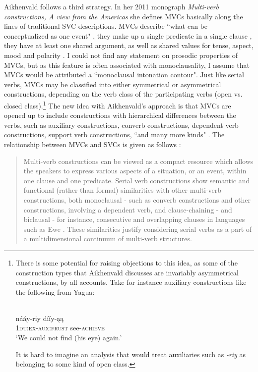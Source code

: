 Aikhenvald follows a third strategy. In her 2011 monograph \textit{Multi-verb constructions, A view from the Americas} she defines MVCs basically along the lines of traditional SVC descriptions. MVCs describe ``what can be conceptualized as one event" \citep[vii]{Aikhenvald2011}, they make up a single predicate in a single clause \citep[1]{Aikhenvald2011}, they have at least one shared argument, as well as shared values for tense, aspect, mood and polarity \citep[19]{Aikhenvald2011}. I could not find any statement on prosodic properties of MVCs, but as this feature is often associated with monoclausality, I assume that MVCs would be attributed a ``monoclausal intonation contour". Just like serial verbs, MVCs may be classified into either symmetrical or asymmetrical constructions, depending on the verb class of the participating verbs (open vs. closed class).\footnote{There is some potential for raising objections to this idea, as some of the construction types that Aikhenvald discusses are invariably asymmetrical constructions, by all accounts. Take for instance auxiliary constructions like the following from Yagua:

\ea 
{}\\
\gll nááy-riy dííy-ąą \\
\textsc{1}\textsc{du}:\textsc{ex}-\textsc{aux}:\textsc{frust} see-\textsc{achieve} \\
\glft `We could not find (his eye) again.'\\ 
\z

It is hard to imagine an analysis that would treat auxiliaries such as \textit{-riy} as belonging to some kind of open class.} The new idea with Aikhenvald's approach is that MVCs are opened up to include constructions with hierarchical differences between the verbs, such as auxiliary constructions, converb constructions, dependent verb constructions, support verb constructions, ``and many more kinds" \citep[vii]{Aikhenvald2011}. The relationship between MVCs and SVCs is given as follows \citep[21]{Aikhenvald2011}:

\begin{quote}Multi-verb constructions can be viewed as a compact resource which allows the speakers to express various aspects of a situation, or an event, within one clause and one predicate. Serial verb constructions show semantic and functional (rather than formal) similarities with other multi-verb constructions, both monoclausal - such as converb constructions and other constructions, involving a dependent verb, and clause-chaining - and biclausal - for instance, consecutive and overlapping clauses in languages such as Ewe \citep{ameka2006ewe}. These similarities justify considering serial verbs as a part of a multidimensional continuum of multi-verb structures. \end{quote}

